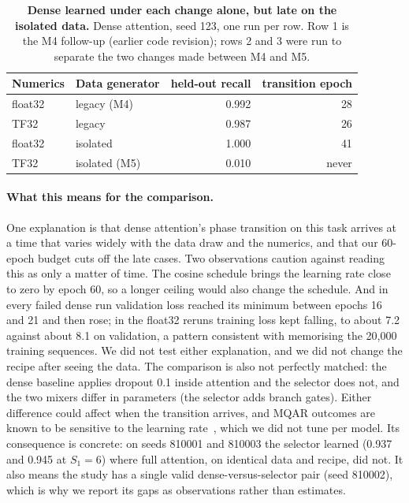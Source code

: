 \begin{table}[t]
\centering
\small
\begin{tabular}{llrr}
\toprule
Numerics & Data generator & held-out recall & transition epoch \\
\midrule
float32 & legacy (M4) & 0.992 & 28 \\
TF32 & legacy & 0.987 & 26 \\
float32 & isolated & 1.000 & 41 \\
TF32 & isolated (M5) & 0.010 & never \\
\bottomrule
\end{tabular}
\caption{\textbf{Dense learned under each change alone, but late on the isolated data.} Dense attention, seed 123,
one run per row. Row 1 is the M4 follow-up (earlier code revision); rows 2 and 3 were run to separate the two
changes made between M4 and M5.}
\label{tab:densecheck}
\end{table}

\paragraph{What this means for the comparison.} One explanation is that dense attention's phase transition on this
task arrives at a time that varies widely with the data draw and the numerics, and that our 60-epoch budget cuts off
the late cases. Two observations caution against reading this as only a matter of time. The cosine schedule brings
the learning rate close to zero by epoch 60, so a longer ceiling would also change the schedule. And in every failed
dense run validation loss reached its minimum between epochs 16 and 21 and then rose; in the float32 reruns training
loss kept falling, to about 7.2 against about 8.1 on validation, a pattern consistent with memorising the 20{,}000
training sequences. We did not test either explanation, and we did not change the recipe after seeing the data. The comparison is also not perfectly matched: the dense baseline applies dropout 0.1 inside
attention and the selector does not, and the two mixers differ in parameters (the selector adds branch gates).
Either difference could affect when the transition arrives, and MQAR outcomes are known to be sensitive to the
learning rate~\cite{okpekpe2025revisiting}, which we did not tune per model. Its consequence is concrete: on seeds 810001 and 810003 the selector learned (0.937 and 0.945 at
$S_1{=}6$) where full attention, on identical data and recipe, did not. It also means the study has a single valid
dense-versus-selector pair (seed 810002), which is why we report its gaps as observations rather than estimates.
